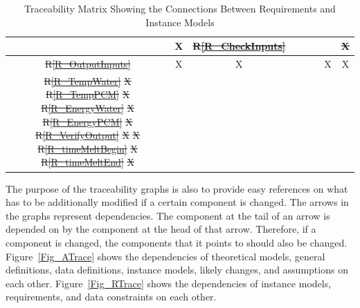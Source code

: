 \documentclass[12pt]{article}
\makeatletter
\newcommand{\rref}[1]{R\ref{#1}}
\providecommand{\DIFaddtex}[1]{{\protect\color{blue}\uwave{#1}}} %
\providecommand{\DIFdeltex}[1]{{\protect\color{red}\sout{#1}}} %
\providecommand{\DIFaddFL}[1]{\DIFadd{#1}} %
\providecommand{\DIFdelFL}[1]{\DIFdel{#1}} %
\providecommand{\DIFaddbeginFL}{} %
\providecommand{\DIFaddendFL}{} %
\providecommand{\DIFdelbeginFL}{} %
\providecommand{\DIFdelendFL}{} %
\providecommand{\DIFadd}[1]{\texorpdfstring{\DIFaddtex{#1}}{#1}} %
\providecommand{\DIFdel}[1]{\texorpdfstring{\DIFdeltex{#1}}{}} %
\newcommand{\DIFscaledelfig}{0.5}
\newlength{\DIFdelgraphicswidth} %
\newlength{\DIFdelgraphicsheight} %
\newcommand{\DIFaddincludegraphics}[2][]{{\color{blue}\fbox{\DIFOincludegraphics[#1]{#2}}}} %
\newcommand{\DIFdelincludegraphics}[2][]{%
\sbox{\DIFdelgraphicsbox}{\DIFOincludegraphics[#1]{#2}}%
\settoboxwidth{\DIFdelgraphicswidth}{\DIFdelgraphicsbox} %
\settoboxtotalheight{\DIFdelgraphicsheight}{\DIFdelgraphicsbox} %
\scalebox{\DIFscaledelfig}{%
\parbox[b]{\DIFdelgraphicswidth}{\usebox{\DIFdelgraphicsbox}\\[-\baselineskip] \rule{\DIFdelgraphicswidth}{0em}}\llap{\resizebox{\DIFdelgraphicswidth}{\DIFdelgraphicsheight}{%
\setlength{\unitlength}{\DIFdelgraphicswidth}%
\begin{picture}(1,1)%
\thicklines\linethickness{2pt} %
{\color[rgb]{1,0,0}\put(0,0){\framebox(1,1){}}}%
{\color[rgb]{1,0,0}\put(0,0){\line( 1,1){1}}}%
{\color[rgb]{1,0,0}\put(0,1){\line(1,-1){1}}}%
\end{picture}%
}\hspace*{3pt}}} %
} %
\DeclareRobustCommand{\DIFaddbeginFL}{\DIFOaddbeginFL \let\includegraphics\DIFaddincludegraphics} %
\DeclareRobustCommand{\DIFaddendFL}{\DIFOaddendFL \let\includegraphics\DIFOincludegraphics} %
\DeclareRobustCommand{\DIFdelbeginFL}{\DIFOdelbeginFL \let\includegraphics\DIFdelincludegraphics} %
\DeclareRobustCommand{\DIFdelendFL}{\DIFOaddendFL \let\includegraphics\DIFOincludegraphics} %
\let\sout@orig\sout %
\renewcommand{\sout}[1]{\ifmmode\text{\sout@orig{\ensuremath{#1}}}\else\sout@orig{#1}\fi} %
\makeatother
\begin{document}
\begin{table}[h!]
\begin{tabular}{|c|c|c|c|c|c|c|c|}
  \DIFaddFL{\rref{R_VerifyOutput} }\DIFaddendFL & 
       \DIFdelbeginFL %
\DIFdelendFL X &   \DIFdelbeginFL %
\DIFdelFL{\rref{R_CheckInputs}   }\DIFdelendFL &   &   &   &   &   \DIFdelbeginFL \DIFdelFL{X}%
\DIFdelendFL \\ 
  \hline
\DIFdelbeginFL \DIFdelFL{\rref{R_OutputInputs}  }\DIFdelendFL \DIFaddbeginFL 

  \DIFaddFL{\rref{R_Output} }\DIFaddendFL & 
       X & X &   &   &   & X & X \\ 
  \hline
  \DIFdelbeginFL \DIFdelFL{\rref{R_TempWater}     }%
\DIFdelFL{X}%
\DIFdelFL{\rref{R_TempPCM}       }%
\DIFdelFL{X}%
\DIFdelFL{\rref{R_EnergyWater}   }%
\DIFdelFL{X}%
\DIFdelFL{\rref{R_EnergyPCM}     }%
\DIFdelFL{X}%
\DIFdelFL{\rref{R_VerifyOutput}  }%
\DIFdelFL{X}%
\DIFdelFL{X}%
\DIFdelFL{\rref{R_timeMeltBegin} }%
\DIFdelFL{X}%
\DIFdelFL{\rref{R_timeMeltEnd}   }%
\DIFdelFL{X }%
\DIFdelendFL \end{tabular}
  \caption{Traceability Matrix Showing the Connections Between Requirements and Instance Models}
  \label{Table:R_trace}
\end{table}

  

The purpose of the traceability graphs is also to provide easy references on
what has to be additionally modified if a certain component is changed.  The
arrows in the graphs represent dependencies. The component at the tail of an
arrow is depended on by the component at the head of that arrow. Therefore, if a
component is changed, the components that it points to should also be
changed. Figure~\ref{Fig_ATrace} shows the dependencies of theoretical models,
general definitions, data definitions, instance models, likely changes, and
assumptions on each other. Figure~\ref{Fig_RTrace} shows the dependencies of
instance models, requirements, and data constraints on each other.
\end{document}
